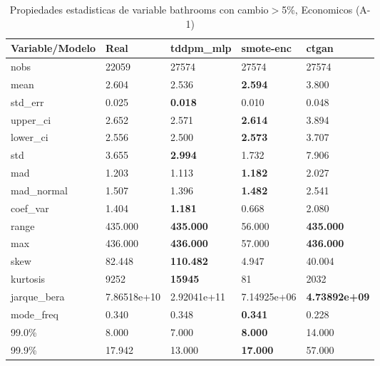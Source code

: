 \begin{table}[H]
\centering
\fontsize{8}{14}\selectfont
\caption{Propiedades estadisticas de variable bathrooms con cambio\ensuremath{>}5\%, Economicos (A-1)}
\label{table-stats-economicos-a-1-bathrooms-short}
\begin{tabular}{|l|m{10em}|m{10em}|m{10em}|m{10em}|}
\hline
 \rowcolor[gray]{0.8}
Variable/Modelo & Real & tddpm\_mlp & smote-enc & ctgan \\
\hline nobs & 22059 & 27574 & 27574 & 27574 \\
\hline mean & 2.604 & 2.536 & \bfseries 2.594 & \cellcolor[rgb]{0.9, 0.54, 0.52} 3.800 \\
\hline std\_err & 0.025 & \bfseries 0.018 & 0.010 & \cellcolor[rgb]{0.9, 0.54, 0.52} 0.048 \\
\hline upper\_ci & 2.652 & 2.571 & \bfseries 2.614 & \cellcolor[rgb]{0.9, 0.54, 0.52} 3.894 \\
\hline lower\_ci & 2.556 & 2.500 & \bfseries 2.573 & \cellcolor[rgb]{0.9, 0.54, 0.52} 3.707 \\
\hline std & 3.655 & \bfseries 2.994 & 1.732 & \cellcolor[rgb]{0.9, 0.54, 0.52} 7.906 \\
\hline mad & 1.203 & 1.113 & \bfseries 1.182 & \cellcolor[rgb]{0.9, 0.54, 0.52} 2.027 \\
\hline mad\_normal & 1.507 & 1.396 & \bfseries 1.482 & \cellcolor[rgb]{0.9, 0.54, 0.52} 2.541 \\
\hline coef\_var & 1.404 & \bfseries 1.181 & \cellcolor[rgb]{0.9, 0.54, 0.52} 0.668 & 2.080 \\
\hline range & 435.000 & \bfseries 435.000 & \cellcolor[rgb]{0.9, 0.54, 0.52} 56.000 & \bfseries 435.000 \\
\hline max & 436.000 & \bfseries 436.000 & \cellcolor[rgb]{0.9, 0.54, 0.52} 57.000 & \bfseries 436.000 \\
\hline skew & 82.448 & \bfseries 110.482 & \cellcolor[rgb]{0.9, 0.54, 0.52} 4.947 & 40.004 \\
\hline kurtosis & 9252 & \bfseries 15945 & \cellcolor[rgb]{0.9, 0.54, 0.52} 81 & 2032 \\
\hline jarque\_bera & 7.86518e+10 & \cellcolor[rgb]{0.9, 0.54, 0.52} 2.92041e+11 & 7.14925e+06 & \bfseries 4.73892e+09 \\
\hline mode\_freq & 0.340 & 0.348 & \bfseries 0.341 & \cellcolor[rgb]{0.9, 0.54, 0.52} 0.228 \\
\hline 99.0\% & 8.000 & 7.000 & \bfseries 8.000 & \cellcolor[rgb]{0.9, 0.54, 0.52} 14.000 \\
\hline 99.9\% & 17.942 & 13.000 & \bfseries 17.000 & \cellcolor[rgb]{0.9, 0.54, 0.52} 57.000 \\
\hline
\end{tabular}
\end{table}
